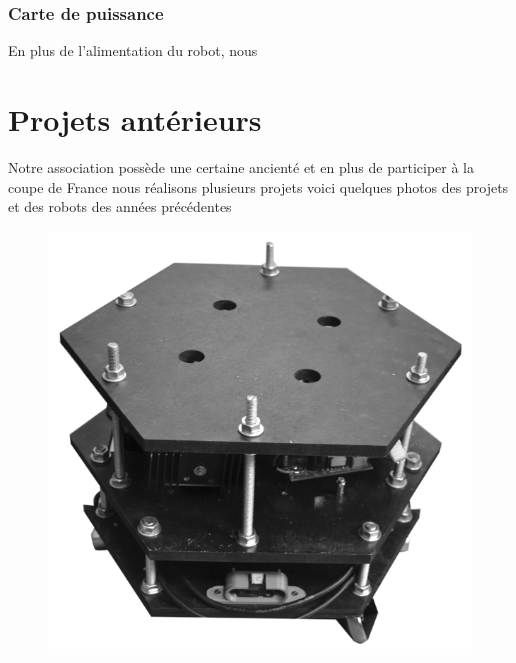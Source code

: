 \documentclass[a4paper,10pt]{article}
\begin{document}
\begin{spacing}{1.5}
\subsubsection{Carte de puissance}
En plus de l'alimentation du robot, nous
\newpage
\section{Projets antérieurs}
Notre association possède une certaine ancienté et en plus de participer à la
coupe de France nous réalisons plusieurs projets voici quelques photos des
projets et des robots des années précédentes
\begin{multicols}{2}
  \begin{figure}[H]
    \center
    \includegraphics[scale=0.3]{1A2018.png}
  \end{figure}
  \columnbreak
  \begin{figure}[H]
    \center

\end{figure}
\end{multicols}
\end{spacing}
\end{document}
